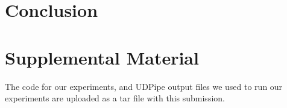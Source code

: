 \documentclass[11pt,a4paper]{article}
\begin{document}
\section{Conclusion}
\label{sec:conclusion}





\appendix

\section{Supplemental Material}
\label{sec:supplemental}
The code for our experiments, and UDPipe output files we used to run our experiments are uploaded as a tar file with this submission.
\end{document}
